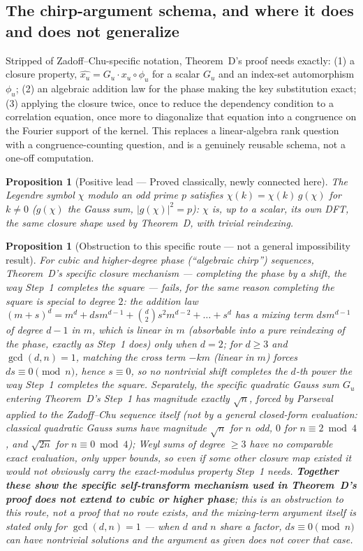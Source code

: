 \documentclass[11pt]{article}
\theoremstyle{plain}
\newtheorem{proposition}[theorem]{Proposition}
\theoremstyle{definition}
\theoremstyle{remark}
\begin{document}
\subsection{The chirp-argument schema, and where it does and does not generalize}

Stripped of Zadoff--Chu-specific notation, Theorem~D's proof needs exactly:
(1) a closure property, $\widehat{x_u}=G_u\cdot x_u\circ\phi_u$ for a
scalar $G_u$ and an index-set automorphism $\phi_u$; (2) an algebraic
addition law for the phase making the key substitution exact; (3) applying
the closure twice, once to reduce the dependency condition to a
correlation equation, once more to diagonalize that equation into a
congruence on the Fourier support of the kernel. This replaces a
linear-algebra rank question with a congruence-counting question, and is a
genuinely reusable schema, not a one-off computation.

\begin{proposition}[Positive lead --- Proved classically, newly connected here]
The Legendre symbol $\chi$ modulo an odd prime $p$ satisfies
$\hat\chi(k)=\chi(k)\,g(\chi)$ for $k\ne0$ ($g(\chi)$ the Gauss sum,
$|g(\chi)|^2=p$): $\chi$ is, up to a scalar, its own DFT, the same closure
shape used by Theorem~D, with trivial reindexing.
\end{proposition}

\begin{proposition}[Obstruction to this specific route --- not a general
impossibility result]
For cubic and higher-degree phase (``algebraic chirp'') sequences,
Theorem~D's specific closure mechanism --- completing the phase by a
shift, the way Step~1 completes the square --- fails, for the same
reason completing the square is special to degree $2$: the addition law
$(m+s)^d=m^d+dsm^{d-1}+\binom d2s^2m^{d-2}+\dots+s^d$ has a mixing term
$dsm^{d-1}$ of degree $d-1$ in $m$, which is linear in $m$ (absorbable into
a pure reindexing of the phase, exactly as Step~1 does) only when $d=2$;
for $d\ge3$ and $\gcd(d,n)=1$, matching the cross term $-km$ (linear in
$m$) forces $ds\equiv0\pmod n$, hence $s\equiv0$, so no nontrivial shift
completes the $d$-th power the way Step~1 completes the square.
Separately, the specific quadratic Gauss sum $G_u$ entering Theorem~D's
Step~1 has magnitude exactly $\sqrt n$, forced by Parseval applied to the
Zadoff--Chu sequence itself (not by a general closed-form evaluation:
classical quadratic Gauss sums have magnitude $\sqrt n$ for $n$ odd, $0$
for $n\equiv2\bmod4$, and $\sqrt{2n}$ for $n\equiv0\bmod4$); Weyl sums of
degree $\ge3$ have no comparable exact evaluation, only upper bounds, so
even if some other closure map existed it would not obviously carry the
exact-modulus property Step~1 needs.
\textbf{Together these show the specific self-transform mechanism used in
Theorem~D's proof does not extend to cubic or higher phase}; this is an
obstruction to \emph{this} route, not a proof that no route exists, and
the mixing-term argument itself is stated only for $\gcd(d,n)=1$ ---
when $d$ and $n$ share a factor, $ds\equiv0\pmod n$ can have nontrivial
solutions and the argument as given does not cover that case.
\end{proposition}
\end{document}
